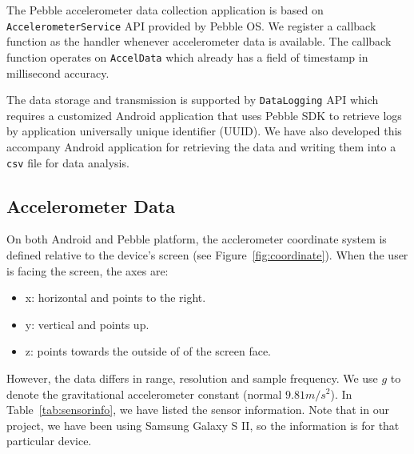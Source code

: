 The Pebble accelerometer data collection application is based on \texttt{AccelerometerService} API provided by Pebble OS. We register a callback function as the handler whenever accelerometer data is available. The callback function operates on \texttt{AccelData} which already has a field of timestamp in millisecond accuracy. 

The data storage and transmission is supported by \texttt{DataLogging} API which requires a customized Android application that uses Pebble SDK to retrieve logs by application universally unique identifier (UUID). We have also developed this accompany Android application for retrieving the data and writing them into a \texttt{csv} file for data analysis.

\subsection{Accelerometer Data}
\label{sec:accelerometer-axes}

On both Android and Pebble platform, the acclerometer coordinate system is defined relative to the device's screen (see Figure~\ref{fig:coordinate}). When the user is facing the screen, the axes are:
\begin{itemize}
\item x: horizontal and points to the right.
\item y: vertical and points up.
\item z: points towards the outside of of the screen face.
\end{itemize}

 


However, the data differs in range, resolution and sample frequency. We use $g$ to denote the gravitational accelerometer constant (normal $9.81 m/s^2$). In Table~\ref{tab:sensorinfo}, we have listed the sensor information. Note that in our project, we have been using Samsung Galaxy S II, so the information is for that particular device. 

